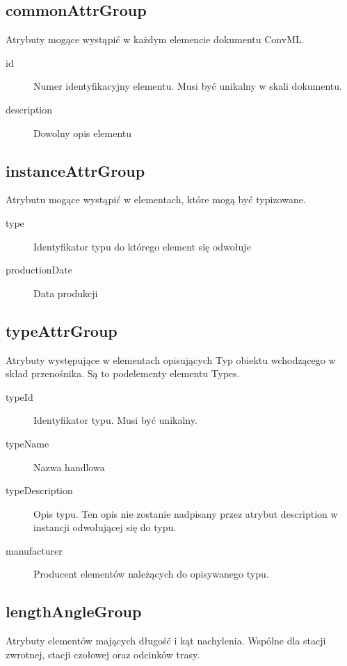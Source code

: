 \documentclass[12pt,a4paper]{article}
\begin{document}
\subsection{commonAttrGroup}
Atrybuty mogące wystąpić w każdym elemencie dokumentu ConvML.

\begin{description}
\item[id] Numer identyfikacyjny elementu. Musi być unikalny w skali dokumentu.
\item[description] Dowolny opis elementu
\end{description}

\subsection{instanceAttrGroup}
Atrybutu mogące wystąpić w elementach, które mogą być typizowane.

\begin{description}
\item[type] Identyfikator typu do którego element się odwołuje
\item[productionDate] Data produkcji 
\end{description}

\subsection{typeAttrGroup}
Atrybuty występujące w elementach opisujących Typ obiektu wchodzącego w skład
przenośnika. Są to podelementy elementu Types.

\begin{description}
\item[typeId] Identyfikator typu. Musi być unikalny.
\item[typeName] Nazwa handlowa
\item[typeDescription] Opis typu. Ten opis nie zostanie nadpisany przez atrybut
  description w instancji odwołującej się do typu.
\item[manufacturer] Producent elementów należących do opisywanego typu. 
\end{description}

\subsection{lengthAngleGroup}
Atrybuty elementów mających długość i kąt nachylenia. Wspólne dla stacji
zwrotnej, stacji czołowej oraz odcinków trasy.
\end{document}
